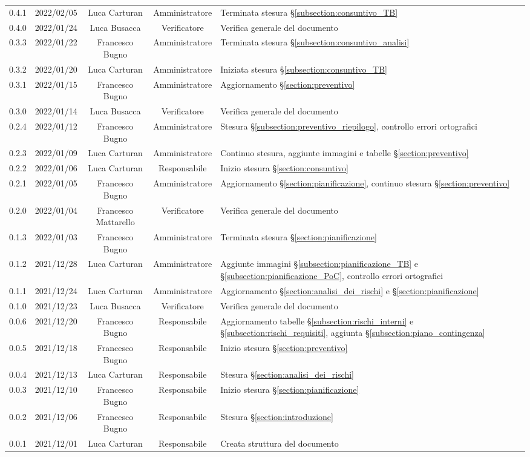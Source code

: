\begin{center}
\begin{longtable}[c]{c | c | c | c | p{5cm}}
		0.4.1 & 2022/02/05 & Luca Carturan & Amministratore & Terminata stesura §\ref{subsection:consuntivo_TB} \\
		0.4.0 & 2022/01/24 & Luca Busacca & Verificatore & Verifica generale del documento\\
		0.3.3 & 2022/01/22 & Francesco Bugno & Amministratore & Terminata stesura §\ref{subsection:consuntivo_analisi} \\
		0.3.2 & 2022/01/20 & Luca Carturan & Amministratore & Iniziata stesura §\ref{subsection:consuntivo_TB} \\
		0.3.1 & 2022/01/15 & Francesco Bugno & Amministratore & Aggiornamento §\ref{section:preventivo} \\
		0.3.0 & 2022/01/14 & Luca Busacca & Verificatore & Verifica generale del documento \\
		0.2.4 & 2022/01/12 & Francesco Bugno & Amministratore & Stesura §\ref{subsection:preventivo_riepilogo}, controllo errori ortografici \\
		0.2.3 & 2022/01/09 & Luca Carturan & Amministratore & Continuo stesura, aggiunte immagini e tabelle §\ref{section:preventivo} \\
		0.2.2 & 2022/01/06 & Luca Carturan & Responsabile & Inizio stesura §\ref{section:consuntivo}\\
		0.2.1 & 2022/01/05 & Francesco Bugno & Amministratore & Aggiornamento §\ref{section:pianificazione}, continuo stesura §\ref{section:preventivo} \\
		0.2.0 & 2022/01/04 & Francesco Mattarello & Verificatore   & Verifica generale del documento \\
		0.1.3 & 2022/01/03 & Francesco Bugno & Amministratore & Terminata stesura §\ref{section:pianificazione} \\
		0.1.2 & 2021/12/28 & Luca Carturan & Amministratore & Aggiunte immagini §\ref{subsection:pianificazione_TB} e §\ref{subsection:pianificazione_PoC}, controllo errori ortografici \\
		0.1.1 & 2021/12/24 & Luca Carturan & Amministratore & Aggiornamento §\ref{section:analisi_dei_rischi} e §\ref{section:pianificazione}\\
		0.1.0 & 2021/12/23 & Luca Busacca & Verificatore   & Verifica generale del documento \\
		0.0.6 & 2021/12/20 & Francesco Bugno & Responsabile   & Aggiornamento tabelle §\ref{subsection:rischi_interni} e §\ref{subsection:rischi_requisiti}, aggiunta §\ref{subsection:piano_contingenza} \\
		0.0.5 & 2021/12/18 & Francesco Bugno & Responsabile & Inizio stesura §\ref{section:preventivo}\\
		0.0.4 & 2021/12/13 & Luca Carturan & Responsabile   & Stesura §\ref{section:analisi_dei_rischi} \\
		0.0.3 & 2021/12/10 & Francesco Bugno & Responsabile & Inizio stesura §\ref{section:pianificazione} \\
		0.0.2 & 2021/12/06 & Francesco Bugno & Responsabile   & Stesura §\ref{section:introduzione} \\
		0.0.1 & 2021/12/01 & Luca Carturan & Responsabile   & Creata struttura del documento
	\end{longtable}
\end{center}